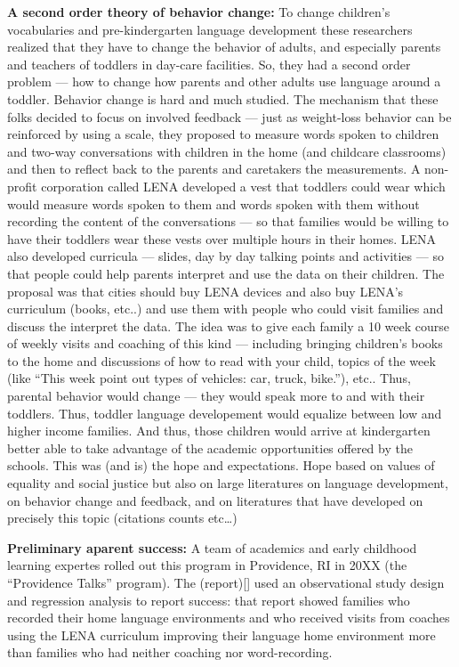\documentclass[
]{article}
\begin{document}
\textbf{A second order theory of behavior change:} To change children's
vocabularies and pre-kindergarten language development these researchers
realized that they have to change the behavior of adults, and especially
parents and teachers of toddlers in day-care facilities. So, they had a
second order problem --- how to change how parents and other adults use
language around a toddler. Behavior change is hard and much studied. The
mechanism that these folks decided to focus on involved feedback ---
just as weight-loss behavior can be reinforced by using a scale, they
proposed to measure words spoken to children and two-way conversations
with children in the home (and childcare classrooms) and then to reflect
back to the parents and caretakers the measurements. A non-profit
corporation called LENA developed a vest that toddlers could wear which
would measure words spoken to them and words spoken with them without
recording the content of the conversations --- so that families would be
willing to have their toddlers wear these vests over multiple hours in
their homes. LENA also developed curricula --- slides, day by day
talking points and activities --- so that people could help parents
interpret and use the data on their children. The proposal was that
cities should buy LENA devices and also buy LENA's curriculum (books,
etc..) and use them with people who could visit families and discuss the
interpret the data. The idea was to give each family a 10 week course of
weekly visits and coaching of this kind --- including bringing
children's books to the home and discussions of how to read with your
child, topics of the week (like ``This week point out types of vehicles:
car, truck, bike.''), etc.. Thus, parental behavior would change ---
they would speak more to and with their toddlers. Thus, toddler language
developement would equalize between low and higher income families. And
thus, those children would arrive at kindergarten better able to take
advantage of the academic opportunities offered by the schools. This was
(and is) the hope and expectations. Hope based on values of equality and
social justice but also on large literatures on language development, on
behavior change and feedback, and on literatures that have developed on
precisely this topic (citations counts etc\ldots)

\textbf{Preliminary aparent success:} A team of academics and early
childhood learning expertes rolled out this program in Providence, RI in
20XX (the ``Providence Talks'' program). The (report){[}{]} used an
observational study design and regression analysis to report success:
that report showed families who recorded their home language
environments and who received visits from coaches using the LENA
curriculum improving their language home environment more than families
who had neither coaching nor word-recording.
\end{document}
